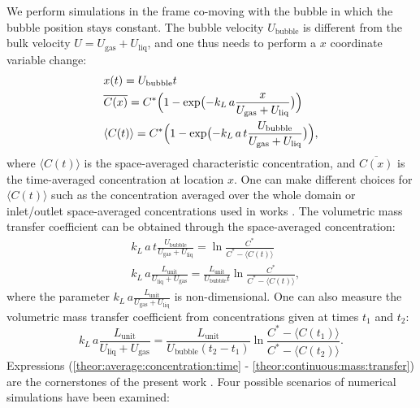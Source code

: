 \documentclass[review,12pt]{elsarticle}
\newcommand{\beq}{\begin{equation}}
\newcommand{\feq}{\end{equation}}
\newcommand{\beqal}{\begin{equation}\begin{aligned}}
\newcommand{\feqal}{\end{aligned}\end{equation}}
\newcommand{\vol}{k_L\,a}
\newcommand{\lunit}{L_{\mathrm{unit}}}
\newcommand{\ububble}{U_{\mathrm{bubble}}}
\newcommand{\uliq}{U_{\mathrm{liq}}}
\newcommand{\ugas}{U_{\mathrm{gas}}}
\newcommand{\cstar}{C^{*}}
\newcommand{\volnondim}{\vol \frac{\lunit}{\uliq+\ugas}}
\begin{document}
We perform simulations in the frame co-moving with the bubble
in which the bubble position stays constant. The bubble velocity $\ububble$ is
different from the bulk velocity $U=\ugas+\uliq$, and one thus needs to perform a $x$ coordinate
variable change:
\beqal
\label{theor:average:concentration:time}
&x(t)=\ububble t\\
&\overline{C(x)}=\cstar \Bigl(1-\exp\bigl(-\vol \frac{x}{\ugas+\uliq}\bigr)\Bigr)\\
&\langle C(t)\rangle=\cstar \Bigl(1-\exp\bigl(-\vol\, t \frac{\ububble}{\ugas+\uliq}\bigr)\Bigr),
\feqal
where $\langle C(t)\rangle$ is the space-averaged characteristic concentration,
and $\overline{C(x)}$ is the time-averaged concentration at location $x$. 
One can make different choices for
$\langle C(t) \rangle$ such as the concentration averaged over the whole domain or inlet/outlet space-averaged
concentrations used in works \cite{vanbaten-circular,kreutzer-overview}.  
The volumetric mass transfer coefficient can be obtained through the space-averaged concentration:
\beqal
\label{theor:one:concentration:time}
&\vol\, t \frac{\ububble}{\ugas+\uliq}=\ln \frac{\cstar}{\cstar-\langle C(t)\rangle}\\
&\volnondim=\frac{\lunit}{\ububble t}\ln \frac{\cstar}{\cstar-\langle C(t) \rangle},
\feqal
where the parameter $\vol \frac{\lunit}{\ugas+\uliq}$ is non-dimensional. One can also measure the
volumetric mass transfer coefficient from concentrations given at times $t_1$ and $t_2$:
\beq
\label{theor:continuous:mass:transfer}
\volnondim=\frac{\lunit}{\ububble
(t_2-t_1)}\ln\frac{C^{*}-\langle C(t_1) \rangle}{C^{*}-\langle C(t_2) \rangle}.
\feq
Expressions (\ref{theor:average:concentration:time} - \ref{theor:continuous:mass:transfer}) are the
cornerstones of the present work . Four possible scenarios of numerical simulations have been examined: 
\end{document}

